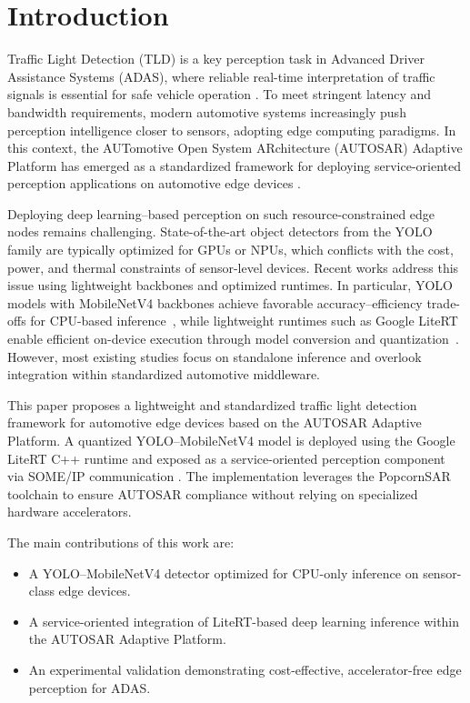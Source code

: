 \section{Introduction}
\label{sec:introduction}

Traffic Light Detection (TLD) is a key perception task in Advanced Driver Assistance Systems (ADAS), where reliable real-time interpretation of traffic signals is essential for safe vehicle operation \cite{9220083}. To meet stringent latency and bandwidth requirements, modern automotive systems increasingly push perception intelligence closer to sensors, adopting edge computing paradigms. In this context, the AUTomotive Open System ARchitecture (AUTOSAR) Adaptive Platform has emerged as a standardized framework for deploying service-oriented perception applications on automotive edge devices \cite{autosar_r21_11}.

Deploying deep learning--based perception on such resource-constrained edge nodes remains challenging. State-of-the-art object detectors from the YOLO family \cite{redmon_2016_you}\cite{ali_2024_the} are typically optimized for GPUs or NPUs, which conflicts with the cost, power, and thermal constraints of sensor-level devices. Recent works address this issue using lightweight backbones and optimized runtimes. In particular, YOLO models with MobileNetV4 backbones achieve favorable accuracy--efficiency trade-offs for CPU-based inference~\cite{lei2025emnv4}\cite{qin_2024_mobilenetv4}, while lightweight runtimes such as Google LiteRT enable efficient on-device execution through model conversion and quantization~\cite{11172322}. However, most existing studies focus on standalone inference and overlook integration within standardized automotive middleware.

This paper proposes a lightweight and standardized traffic light detection framework for automotive edge devices based on the AUTOSAR Adaptive Platform. A quantized YOLO--MobileNetV4 model is deployed using the Google LiteRT C++ runtime and exposed as a service-oriented perception component via SOME/IP communication \cite{autosar_someip_r21_11}. The implementation leverages the PopcornSAR toolchain to ensure AUTOSAR compliance without relying on specialized hardware accelerators.

The main contributions of this work are:
\begin{itemize}
    \item A YOLO--MobileNetV4 detector optimized for CPU-only inference on sensor-class edge devices.
    \item A service-oriented integration of LiteRT-based deep learning inference within the AUTOSAR Adaptive Platform.
    \item An experimental validation demonstrating cost-effective, accelerator-free edge perception for ADAS.
\end{itemize}

